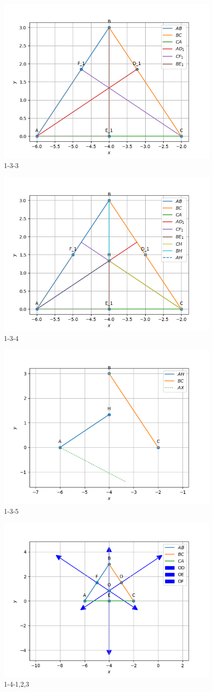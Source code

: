 \documentclass[journal,12pt,onecolumn]{IEEEtran}
\theoremstyle{remark}
\begin{document}
\begin{figure}[!ht]
	\centering
	\includegraphics[width=0.5\columnwidth]{figs/1-3-3.png}
	\caption{1-3-3}
	\label{fig33:Triangle_with_centroid}	
\end{figure}
\begin{figure}[!ht]
	\centering
	\includegraphics[width=0.5\columnwidth]{figs/1-3-4.png}
	\caption{1-3-4}
	\label{fig33:Triangle_with_centroid}	
\end{figure}
\begin{figure}[!ht]
	\centering
	\includegraphics[width=0.5\columnwidth]{figs/1-3-5.png}
	\caption{1-3-5}
	\label{fig33:Triangle_with_centroid}	
\end{figure}
\begin{figure}[!ht]
	\centering
	\includegraphics[width=0.5\columnwidth]{figs/1-4-1,2,3.png}
	\caption{1-4-1,2,3}
	\label{fig33:Triangle_with_centroid}	
\end{figure}
\end{document}
